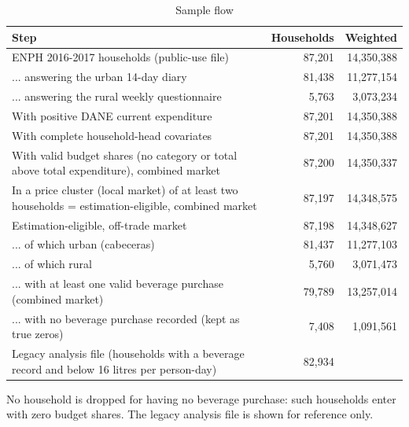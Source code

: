 \begin{table}[!htbp]
\centering
\begin{threeparttable}
\caption{Sample flow}
\label{tab:sampleflow}
\footnotesize
\begin{tabular}{p{10.5cm}rr}
\toprule
Step & Households & Weighted \\
\midrule
ENPH 2016-2017 households (public-use file) & 87,201 & 14,350,388 \\
... answering the urban 14-day diary & 81,438 & 11,277,154 \\
... answering the rural weekly questionnaire & 5,763 & 3,073,234 \\
With positive DANE current expenditure & 87,201 & 14,350,388 \\
With complete household-head covariates & 87,201 & 14,350,388 \\
With valid budget shares (no category or total above total expenditure), combined market & 87,200 & 14,350,337 \\
In a price cluster (local market) of at least two households = estimation-eligible, combined market & 87,197 & 14,348,575 \\
Estimation-eligible, off-trade market & 87,198 & 14,348,627 \\
... of which urban (cabeceras) & 81,437 & 11,277,103 \\
... of which rural & 5,760 & 3,071,473 \\
... with at least one valid beverage purchase (combined market) & 79,789 & 13,257,014 \\
... with no beverage purchase recorded (kept as true zeros) & 7,408 & 1,091,561 \\
Legacy analysis file (households with a beverage record and below 16 litres per person-day) & 82,934 &  \\
\bottomrule
\end{tabular}
\begin{tablenotes}[flushleft]
\footnotesize
\item No household is dropped for having no beverage purchase: such households enter with zero budget shares. The legacy analysis file is shown for reference only.
\end{tablenotes}
\end{threeparttable}
\end{table}
